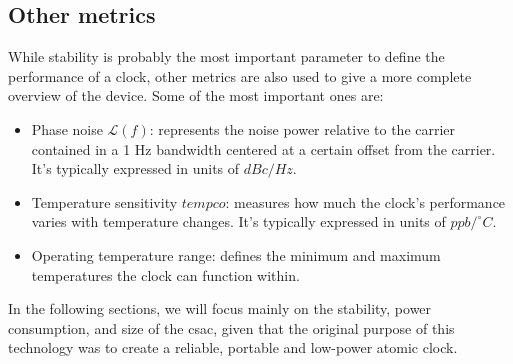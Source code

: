 \subsection{Other metrics}
\label{subsec:other_metrics}

While stability is probably the most important parameter to define the performance of a clock, other metrics are also used to give a more complete overview of the device.
Some of the most important ones are:

\begin{itemize}
  \item Phase noise $\mathcal{L}(f)$: represents the noise power relative to the carrier contained in a 1 Hz bandwidth centered at a certain offset from the carrier. It's typically expressed in units of $dBc/Hz$.
  \item Temperature sensitivity $tempco$: measures how much the clock's performance varies with temperature changes. It's typically expressed in units of $ppb/^\circ C$.
  \item Operating temperature range: defines the minimum and maximum temperatures the clock can function within.
\end{itemize}

In the following sections, we will focus mainly on the stability, power consumption, and size of the \acrshort{csac}, given that the original purpose of this technology was to create a reliable, portable and low-power atomic clock.

